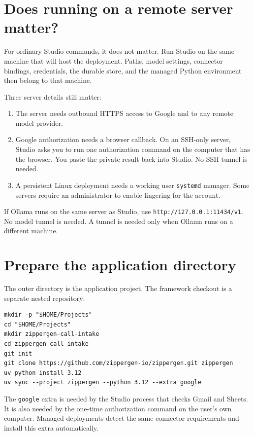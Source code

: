 \documentclass[11pt,a4paper]{article}
\begin{document}
\section{Does running on a remote server matter?}

For ordinary Studio commands, it does not matter. Run Studio on the same
machine that will host the deployment. Paths, model settings, connector
bindings, credentials, the durable store, and the managed Python environment
then belong to that machine.

Three server details still matter:

\begin{enumerate}
  \item The server needs outbound HTTPS access to Google and to any remote
        model provider.
  \item Google authorization needs a browser callback. On an SSH-only server,
        Studio asks you to run one authorization command on the computer that
        has the browser. You paste the private result back into Studio. No SSH
        tunnel is needed.
  \item A persistent Linux deployment needs a working user
        \texttt{systemd} manager. Some servers require an administrator to
        enable lingering for the account.
\end{enumerate}

If Ollama runs on the same server as Studio, use
\texttt{http://127.0.0.1:11434/v1}. No model tunnel is needed. A tunnel is
needed only when Ollama runs on a different machine.

\section{Prepare the application directory}

The outer directory is the application project. The framework checkout is a
separate nested repository:

\begin{lstlisting}[style=shell]
mkdir -p "$HOME/Projects"
cd "$HOME/Projects"
mkdir zippergen-call-intake
cd zippergen-call-intake
git init
git clone https://github.com/zippergen-io/zippergen.git zippergen
uv python install 3.12
uv sync --project zippergen --python 3.12 --extra google
\end{lstlisting}

The \texttt{google} extra is needed by the Studio process that checks Gmail
and Sheets. It is also needed by the one-time authorization command on the
user's own computer. Managed deployments detect the same connector requirements
and install this extra automatically.
\end{document}
